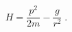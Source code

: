 \begin{equation}
H= \frac{ p^{2}}{2m}  - \frac{g}{r^{2}}
\; . 
\label{eq:ISP_Hamiltonian_unregularized}
\end{equation}

